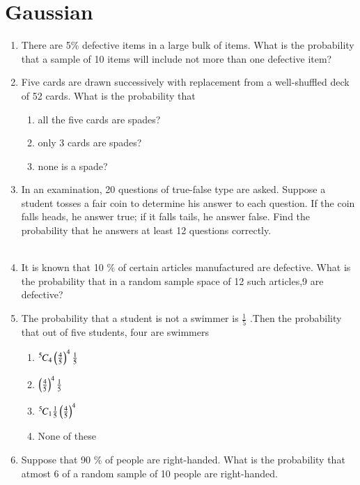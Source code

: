     \section{Gaussian}
\begin{enumerate}[label=\thesection.\arabic*,ref=\thesection.\theenumi]
\item There are 5\% defective items in a large bulk of items. What is the probability that a sample of 10 items will include not more than one defective item?
	\\
\solution
%
\item Five cards are drawn successively with replacement from a well-shuffled deck
of 52 cards. What is the probability that
\begin{enumerate}
    \item all the five cards are spades?
    \item only 3 cards are spades?
    \item none is a spade?
\end{enumerate}
\solution
%
\item In an examination, 20 questions of true-false type are asked. Suppose a student tosses a fair coin to determine his answer to each question. If the coin falls heads, he answer true; if it falls tails, he answer false. Find the probability that he answers at least 12 questions correctly.\\
\\
\solution
%
\item It is known that 10 $\%$ of certain articles manufactured are defective. What is the probability that in a random sample space of 12 such articles,9 are defective? \\
\solution

\item The probability that a student is not a swimmer is $\frac{1}{5}$ .Then the probability that out of five students, four are swimmers 
\begin{enumerate}
    \item ${{}^{5}\mkern-1muC_{4}}\left(\frac{4}{5}\right)^{4}\frac{1}{5}$ \label{item:12/13/5/15/1} \\
    \item $\left(\frac{4}{5}\right)^{4}\frac{1}{5}$ \label{item:12/13/5/15/2}\\
    \item \label{3}${{}^{5}\mkern-1muC_{1}}\frac{1}{5}\left(\frac{4}{5}\right)^{4}$\\
    \item None of these
\end{enumerate}
\solution


\item Suppose that 90 \% of people are right-handed. What is the probability that atmost 6 of a random sample of 10 people are right-handed. 
	\\
\solution


\end{enumerate}
